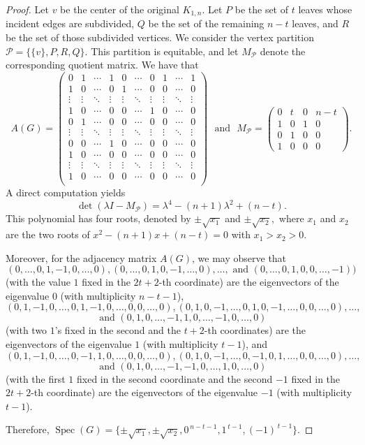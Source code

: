 \documentclass[a4paper,12pt]{article}
\theoremstyle{plain}
\begin{document}
\begin{proof}
Let $v$ be the center of the original $K_{1,n}$.
Let $P$ be the set of $t$ leaves whose incident edges are subdivided,
$Q$ be the set of the remaining $n-t$ leaves, and
$R$ be the set of those subdivided vertices.
We consider the vertex partition
$\mathcal{P}=\{\{v\},P,R,Q\}.$
This partition is equitable, and let $M_{\mathcal{P}}$ denote the corresponding quotient matrix. We have that 
$$
A(G)=
\begin{pmatrix}
0 & 1 &\cdots & 1 & 0 & \cdots & 0 & 1 &\cdots & 1\\
1 & 0 &\cdots & 0 & 1 & \cdots & 0 & 0 &\cdots & 0\\
\vdots & \vdots & \ddots & \vdots & \vdots & \ddots & \vdots 
& \vdots & \ddots & \vdots \\
1 & 0 &\cdots & 0 & 0 & \cdots & 1 & 0 &\cdots &0\\
0 & 1 &\cdots & 0 & 0 & \cdots & 0 & 0 &\cdots &0\\
\vdots &\vdots & \ddots & \vdots & \vdots & \ddots & \vdots & \vdots & \ddots & \vdots \\
0 & 0 & \cdots & 1 & 0 &\cdots & 0 & 0 &\cdots &0\\
1 & 0 &\cdots & 0 & 0 & \cdots & 0 & 0 &\cdots &0\\
\vdots & \vdots & \ddots & \vdots & \vdots & \ddots & \vdots & \vdots & \ddots & \vdots \\
1 & 0 &\cdots & 0 & 0 & \cdots & 0& 0 &\cdots & 0\\
\end{pmatrix}
\text{~~and~~} M_{\mathcal{P}}=
\begin{pmatrix}
0 & t & 0 & n-t\\
1 & 0 & 1 & 0\\
0 & 1 & 0 & 0\\
1 & 0 & 0 & 0
\end{pmatrix}.$$
A direct computation yields
$$\det(\lambda I-M_{\mathcal{P}})
=\lambda^4-(n+1)\lambda^2+(n-t).$$
This polynomial has four roots, denoted by
$\pm \sqrt{x_1}$ and $\pm \sqrt{x_2},$ where $x_1$ and $x_2$ are the two roots of 
$x^2-(n+1)x+(n-t)=0$ with $x_1>x_2>0$. 



Moreover, for the adjacency matrix $A(G)$, we may observe that $$(0,\ldots,0,1,-1,0,\ldots,0), (0,\ldots,0,1,0,-1,\ldots,0),      \ldots, \text{~and~} (0,\ldots,0,1,0,0,\ldots,-1))$$ (with the value $1$ fixed in the $2t+2$-th coordinate) are the eigenvectors of the eigenvalue $0$ (with multiplicity $n-t-1$), 
$$(0,1,-1,0,\ldots,0,1,-1,0,\ldots,0,0,\ldots,0),(0,1,0,-1,\ldots,0,1,0,-1,\ldots,0,0,\ldots,0),\ldots, $$ $$\text{~and~}(0,1,0,\ldots,-1,1,0,\ldots,-1,0,\ldots,0)$$ (with two $1$'s fixed in the second and the $t+2$-th coordinates) are the eigenvectors of the eigenvalue $1$ (with multiplicity $t-1$), and 
$$(0,1,-1,0,\ldots,0,-1,1,0,\ldots,0,0,\ldots,0),(0,1,0,-1,\ldots,0,-1,0,1,\ldots,0,0,\ldots,0),\ldots, $$ $$\text{~and~}(0,1,0,\ldots,-1,-1,0,\ldots,1,0,\ldots,0)$$ (with the first $1$ fixed in the second coordinate and the second $-1$ fixed in the $2t+2$-th coordinate) are the eigenvectors of the eigenvalue $-1$ (with multiplicity $t-1$). 

Therefore, $\operatorname{Spec}(G)=\{\pm\sqrt{x_1},\pm\sqrt{x_2},0^{\,n-t-1},1^{\,t-1},(-1)^{\,t-1}\}.$
\end{proof}
\end{document}
